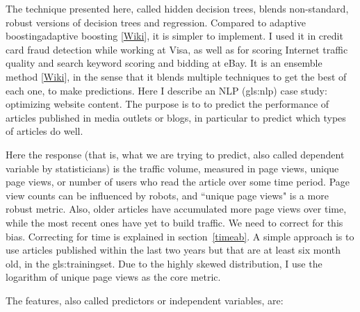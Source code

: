 \documentclass[oneside,10pt]{book}
\renewcommand{\arraystretch}{1.4} %
\begin{document}
The technique presented here, called \textcolor{index}{hidden decision trees}, blends non-standard, robust versions of
 \textcolor{index}{decision trees} and regression. Compared to \textcolor{index}{adaptive boosting}\textcolor{index}{adaptive boosting} [\href{https://en.wikipedia.org/wiki/AdaBoost}{Wiki}], it is simpler to implement. I used it in credit card fraud detection while working at Visa, as well as for scoring Internet traffic quality and search keyword scoring and bidding at eBay. It is an \textcolor{index}{ensemble method} [\href{https://en.wikipedia.org/wiki/Ensemble_learning}{Wiki}], in the sense that it
blends multiple techniques to get the best of each one, to make predictions.  Here I describe an NLP (\gls{gls:nlp}) case study: optimizing website content.
The purpose is to to predict the performance of articles published in media outlets or blogs, in particular to predict which types of articles do well.


Here the response (that is, what we are trying to predict, also called dependent variable by statisticians) is the traffic volume, measured in page views, unique page views, or number of users who read the article over some time period. Page view counts
can be influenced by robots, and ``unique page views" is a more robust metric. Also, older articles have accumulated more page views over time, while the most recent ones
 have yet to build traffic. We need to correct for this bias.
Correcting for time is explained in section~\ref{timeab}. A simple approach is to use articles published within the last two years but that are at least six month old, in the \gls{gls:trainingset}. Due to
 the highly skewed distribution, I use the logarithm of unique page views as the core metric.

The features, also called predictors or independent variables, are:\vspace{1ex}

\renewcommand{\arraystretch}{1.2} %
\end{document}

